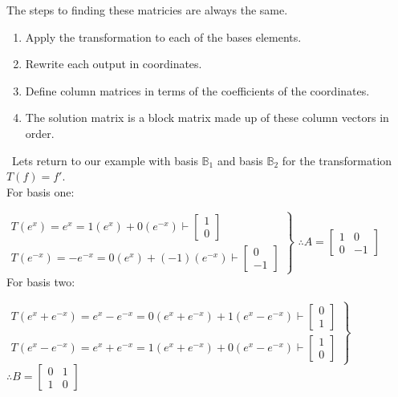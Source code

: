 \documentclass[11 pt]{article}
\begin{document}
The steps to finding these matricies are always the same.
\begin{enumerate}
\item Apply the transformation to each of the bases elements.
\item Rewrite each output in coordinates.
\item Define column matrices in terms of the coefficients of the coordinates.
\item The solution matrix is a block matrix made up of these column vectors in order.
\end{enumerate}

$\,\,\,$Lets return to our example with basis $\mathbb{B}_1$ and basis $\mathbb{B}_2$ for the transformation $T(f)=f\prime$.\\

For basis one:

$\left.\begin{matrix}T(e^x)=e^x=1(e^x)+0(e^{-x})\vdash \begin{bmatrix}1\\0\end{bmatrix}\\T(e^{-x})=-e^{-x}=0(e^x)+(-1)(e^{-x})\vdash \begin{bmatrix}0\\-1\end{bmatrix}\end{matrix}\right\rbrace$
$\therefore A=\begin{bmatrix}1 & 0\\0 & -1\end{bmatrix}$\\

For basis two:

$\left.\begin{matrix}T(e^x+e^{-x})=e^x-e^{-x}=0(e^x+e^{-x})+1(e^x-e^{-x})\vdash \begin{bmatrix}0\\1\end{bmatrix}\\T(e^x-e^{-x})=e^x+e^{-x}=1(e^x+e^{-x})+0(e^x-e^{-x})\vdash \begin{bmatrix}1\\0\end{bmatrix}\end{matrix}\right\rbrace$
$\therefore B=\begin{bmatrix}0 & 1\\1 & 0\end{bmatrix}$
\end{document}

